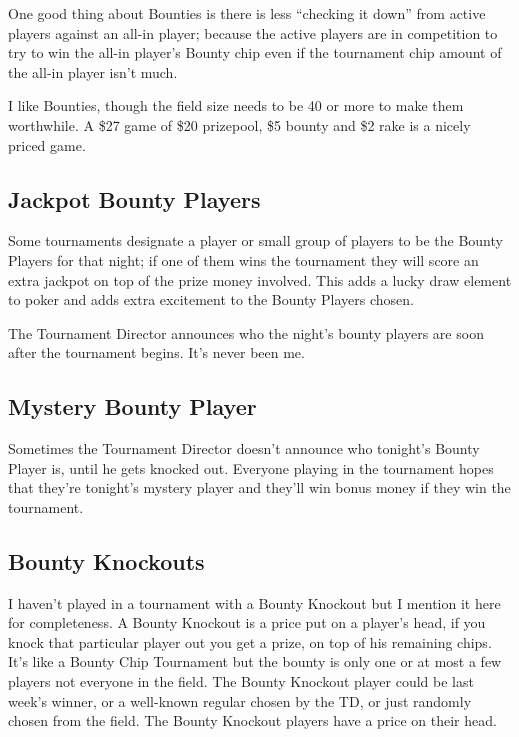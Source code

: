 One good thing about Bounties is there is less ``checking it down''
from active players against an all-in player; because the active
players are in competition to try to win the all-in player's
Bounty chip even if the tournament chip amount of the all-in player
isn't much.

I like Bounties, though the field size needs to be 40 or more to
make them worthwhile. A \$27 game of \$20 prizepool, \$5 bounty
and \$2 rake is a nicely priced game.

\subsection{Jackpot Bounty Players}

Some tournaments designate a player or small group of players
to be the Bounty Players for that night; if one of them wins
the tournament they will score an extra jackpot on top of
the prize money involved. This adds a lucky draw element to
poker and adds extra excitement to the Bounty Players chosen.

The Tournament Director announces who the night's bounty players
are soon after the tournament begins. It's never been me.

\subsection{Mystery Bounty Player}

Sometimes the Tournament Director doesn't announce who tonight's
Bounty Player is, until he gets knocked out. Everyone playing in the
tournament hopes that they're tonight's mystery player and they'll
win bonus money if they win the tournament.

\subsection{Bounty Knockouts}

I haven't played in a tournament with a Bounty Knockout but I
mention it here for completeness. A Bounty Knockout is a price
put on a player's head, if you knock that particular player out
you get a prize, on top of his remaining chips. It's like a
Bounty Chip Tournament but the bounty is only one or at most
a few players not everyone in the field. The Bounty Knockout player
could be last week's winner, or a well-known regular chosen
by the TD, or just randomly chosen from the field. The Bounty Knockout
players have a price on their head.

